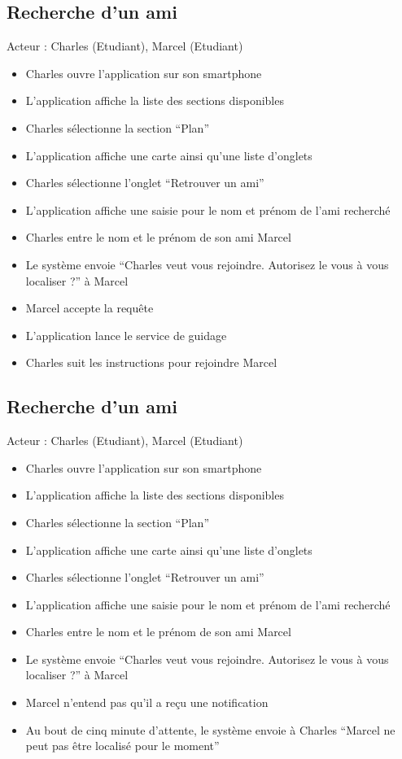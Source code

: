 \subsection*{Recherche d’un ami}
Acteur : Charles (Etudiant), Marcel (Etudiant)
\begin{itemize}
\item Charles ouvre l’application sur son smartphone 
\item L’application affiche la liste des sections disponibles 
\item Charles sélectionne la section “Plan” 
\item L’application affiche une carte ainsi qu’une liste d’onglets 
\item Charles sélectionne l’onglet “Retrouver un ami” 
\item L'application affiche une saisie pour le nom et prénom de l'ami recherché 
\item Charles entre le nom et le prénom de son ami Marcel 
\item Le système envoie “Charles veut vous rejoindre.  Autorisez le vous à vous localiser ?” à Marcel 
\item Marcel accepte la requête 
\item L’application lance le service de guidage 
\item Charles suit les instructions pour rejoindre Marcel  
\end{itemize}

\subsection*{Recherche d'un ami}
Acteur : Charles (Etudiant), Marcel (Etudiant)
\begin{itemize}
\item Charles ouvre l’application sur son smartphone 
\item L’application affiche la liste des sections disponibles 
\item Charles sélectionne la section “Plan” 
\item L’application affiche une carte ainsi qu’une liste d’onglets 
\item Charles sélectionne l’onglet “Retrouver un ami” 
\item L’application affiche une saisie pour le nom et prénom de l'ami recherché
\item Charles entre le nom et le prénom de son ami Marcel 
\item Le système envoie “Charles veut vous rejoindre.  Autorisez le vous à vous localiser ?” à Marcel 
\item Marcel n’entend pas qu’il a reçu une notification 
\item Au bout de cinq minute d’attente, le système envoie à Charles “Marcel ne peut pas être localisé pour le moment” 
\end{itemize}


